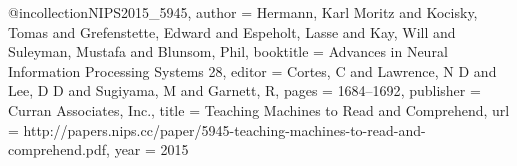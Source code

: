 
@incollection{NIPS2015_5945,
author = {Hermann, Karl Moritz and Kocisky, Tomas and Grefenstette, Edward and Espeholt, Lasse and Kay, Will and Suleyman, Mustafa and Blunsom, Phil},
booktitle = {Advances in Neural Information Processing Systems 28},
editor = {Cortes, C and Lawrence, N D and Lee, D D and Sugiyama, M and Garnett, R},
pages = {1684--1692},
publisher = {Curran Associates, Inc.},
title = {{Teaching Machines to Read and Comprehend}},
url = {http://papers.nips.cc/paper/5945-teaching-machines-to-read-and-comprehend.pdf},
year = {2015}
}
